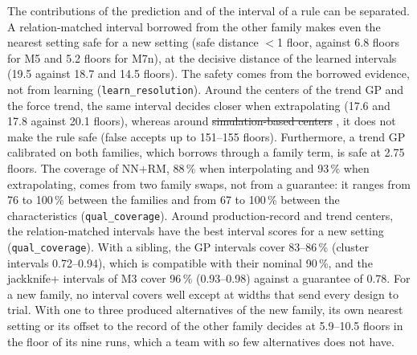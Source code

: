 \documentclass[pdflatex,sn-basic,lineno]{sn-jnl}
\newcommand{\res}[1]{\texttt{#1}}  %
\providecommand{\DIFadd}[1]{{\protect\color{blue}\uwave{#1}}} %
\providecommand{\DIFdel}[1]{{\protect\color{red}\sout{#1}}}                      %
\providecommand{\DIFaddbegin}{} %
\providecommand{\DIFaddend}{} %
\providecommand{\DIFdelbegin}{} %
\providecommand{\DIFdelend}{} %
\newcommand{\DIFscaledelfig}{0.5}
\newlength{\DIFdelgraphicswidth} %
\newlength{\DIFdelgraphicsheight} %
\newcommand{\DIFaddincludegraphics}[2][]{{\color{blue}\fbox{\DIFOincludegraphics[#1]{#2}}}} %
\newcommand{\DIFdelincludegraphics}[2][]{%
\sbox{\DIFdelgraphicsbox}{\DIFOincludegraphics[#1]{#2}}%
\settoboxwidth{\DIFdelgraphicswidth}{\DIFdelgraphicsbox} %
\settoboxtotalheight{\DIFdelgraphicsheight}{\DIFdelgraphicsbox} %
\scalebox{\DIFscaledelfig}{%
\parbox[b]{\DIFdelgraphicswidth}{\usebox{\DIFdelgraphicsbox}\\[-\baselineskip] \rule{\DIFdelgraphicswidth}{0em}}\llap{\resizebox{\DIFdelgraphicswidth}{\DIFdelgraphicsheight}{%
\setlength{\unitlength}{\DIFdelgraphicswidth}%
\begin{picture}(1,1)%
\thicklines\linethickness{2pt} %
{\color[rgb]{1,0,0}\put(0,0){\framebox(1,1){}}}%
{\color[rgb]{1,0,0}\put(0,0){\line( 1,1){1}}}%
{\color[rgb]{1,0,0}\put(0,1){\line(1,-1){1}}}%
\end{picture}%
}\hspace*{3pt}}} %
} %
\DeclareRobustCommand{\DIFaddbegin}{\DIFOaddbegin \let\includegraphics\DIFaddincludegraphics} %
\DeclareRobustCommand{\DIFaddend}{\DIFOaddend \let\includegraphics\DIFOincludegraphics} %
\DeclareRobustCommand{\DIFdelbegin}{\DIFOdelbegin \let\includegraphics\DIFdelincludegraphics} %
\DeclareRobustCommand{\DIFdelend}{\DIFOaddend \let\includegraphics\DIFOincludegraphics} %
\begin{document}
The contributions of the prediction and of the interval of a rule can be separated. A relation-matched interval borrowed from the other family makes even the nearest setting safe for a new setting (safe distance $<$1 floor, against 6.8 floors for M5 and 5.2 floors for M7n), at the decisive distance of the learned intervals (19.5 against 18.7 and 14.5 floors). The safety comes from the borrowed evidence, not from learning (\res{learn\_resolution}). Around the centers of the trend GP and the force trend, the same interval decides closer when extrapolating (17.6 and 17.8 against 20.1 floors), whereas around \DIFdelbegin \DIFdel{simulation-based centers }\DIFdelend \DIFaddbegin \DIFadd{the centers of M1s and M7}\DIFaddend , it does not make the rule safe (false accepts up to 151--155 floors). Furthermore, a trend GP calibrated on both families, which borrows through a family term, is safe at 2.75 floors. The coverage of NN+RM, 88\,\% when interpolating and 93\,\% when extrapolating, comes from two family swaps, not from a guarantee: it ranges from 76 to 100\,\% between the families and from 67 to 100\,\% between the characteristics (\res{qual\_coverage}). Around production-record and trend centers, the relation-matched intervals have the best interval scores \citep{gneiting2007strictly} for a new setting (\res{qual\_coverage}). With a sibling, the GP intervals cover 83--86\,\% (cluster intervals 0.72--0.94), which is compatible with their nominal 90\,\%, and the jackknife+ intervals of M3 cover 96\,\% (0.93--0.98) against a guarantee of 0.78. For a new family, no interval covers well except at widths that send every design to trial. With one to three produced alternatives of the new family, its own nearest setting or its offset to the record of the other family decides at 5.9--10.5 floors in the floor of its nine runs, which a team with so few alternatives does not have.
\end{document}
